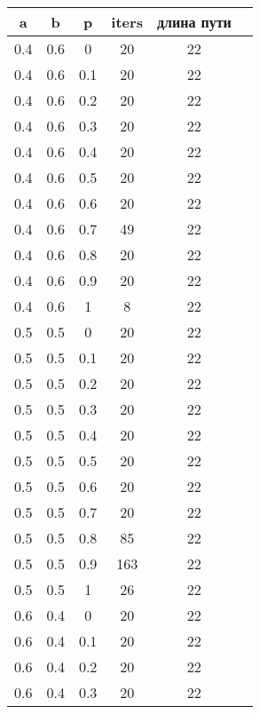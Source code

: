 \documentclass[a4paper,14pt]{extreport}
\begin{document}
\begin{table}[!h]
	\begin{center}
		\begin{tabular}{c@{\hspace{7mm}}c@{\hspace{7mm}}c@{\hspace{7mm}}c@{\hspace{7mm}}c@{\hspace{7mm}}c}
			\toprule
			a        &b      &p      &iters &длина пути \\
			\midrule
			0.4     &0.6    &0      &20    &22\\
			0.4     &0.6    &0.1    &20    &22\\
			0.4     &0.6    &0.2    &20    &22\\
			0.4     &0.6    &0.3    &20    &22\\
			0.4     &0.6    &0.4    &20    &22\\
			0.4     &0.6    &0.5    &20    &22\\
			0.4     &0.6    &0.6    &20    &22\\
			0.4     &0.6    &0.7    &49    &22\\
			0.4     &0.6    &0.8    &20    &22\\
			0.4     &0.6    &0.9    &20    &22\\
			0.4     &0.6    &1      &8     &22\\
			\midrule
			0.5     &0.5    &0      &20    &22\\
			0.5     &0.5    &0.1    &20    &22\\
			0.5     &0.5    &0.2    &20    &22\\
			0.5     &0.5    &0.3    &20    &22\\
			0.5     &0.5    &0.4    &20    &22\\
			0.5     &0.5    &0.5    &20    &22\\
			0.5     &0.5    &0.6    &20    &22\\
			0.5     &0.5    &0.7    &20    &22\\
			0.5     &0.5    &0.8    &85    &22\\
			0.5     &0.5    &0.9    &163   &22\\
			0.5     &0.5    &1      &26    &22\\
			\midrule
			0.6     &0.4    &0      &20    &22\\
			0.6     &0.4    &0.1    &20    &22\\
			0.6     &0.4    &0.2    &20    &22\\
			0.6     &0.4    &0.3    &20    &22\\

\end{tabular}
\end{center}
\end{table}
\end{document}
